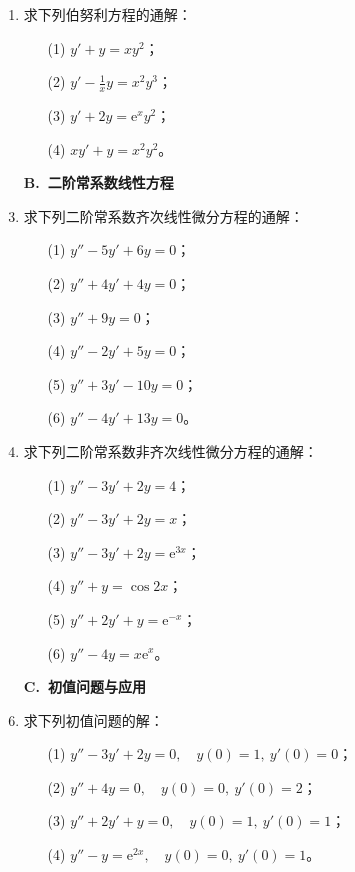 \documentclass[fontset=fandol]{ctexart}
\newcommand{\ee}{\mathrm{e}}
\begin{document}
\begin{enumerate}
\item 求下列伯努利方程的通解：
\begin{enumerate}
\item[(1)] $y'+y=xy^2$；
\item[(2)] $\displaystyle y'-\frac1x y=x^2y^3$；
\item[(3)] $y'+2y=\ee^xy^2$；
\item[(4)] $\displaystyle xy'+y=x^2y^2$。
\end{enumerate}

\item[]\textbf{B.\ 二阶常系数线性方程}
\setcounter{enumi}{0}
\item 求下列二阶常系数齐次线性微分方程的通解：
\begin{enumerate}
\item[(1)] $y''-5y'+6y=0$；
\item[(2)] $y''+4y'+4y=0$；
\item[(3)] $y''+9y=0$；
\item[(4)] $y''-2y'+5y=0$；
\item[(5)] $y''+3y'-10y=0$；
\item[(6)] $y''-4y'+13y=0$。
\end{enumerate}

\item 求下列二阶常系数非齐次线性微分方程的通解：
\begin{enumerate}
\item[(1)] $y''-3y'+2y=4$；
\item[(2)] $y''-3y'+2y=x$；
\item[(3)] $y''-3y'+2y=\ee^{3x}$；
\item[(4)] $y''+y=\cos2x$；
\item[(5)] $y''+2y'+y=\ee^{-x}$；
\item[(6)] $y''-4y=x\ee^{x}$。
\end{enumerate}

\item[]\textbf{C.\ 初值问题与应用}
\setcounter{enumi}{0}
\item 求下列初值问题的解：
\begin{enumerate}
\item[(1)] $y''-3y'+2y=0,\quad y(0)=1,\ y'(0)=0$；
\item[(2)] $y''+4y=0,\quad y(0)=0,\ y'(0)=2$；
\item[(3)] $y''+2y'+y=0,\quad y(0)=1,\ y'(0)=1$；
\item[(4)] $y''-y=\ee^{2x},\quad y(0)=0,\ y'(0)=1$。
\end{enumerate}


\end{enumerate}
\end{document}
